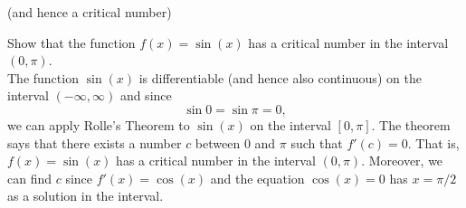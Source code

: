 \documentclass[handout]{ximera}
\begin{document}
(and hence a critical number)

\begin{example} Show that the function $f(x) = \sin(x)$ has a critical number in the interval $(0, \pi)$.\\
The function $\sin(x)$ is differentiable (and hence also continuous) on the interval $(-\infty, \infty)$ and since
\[
\sin 0 = \sin \pi = 0,
\]
we can apply Rolle's Theorem to $\sin(x)$ on the interval $[0, \pi]$. The theorem says that there exists a number $c$ between $0$ and $\pi$ such that 
$f'(c) = 0$. That is, $f(x) = \sin(x)$ has a critical number in the interval $(0, \pi)$.
Moreover, we can find $c$ since $f'(x) = \cos(x)$ and the equation $\cos(x) = 0$ has $x = \pi/2$ as a solution in the interval.
\end{example}
\end{document}
